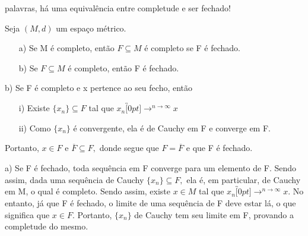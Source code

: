 \documentclass[MetricSpaces/metric_notes.tex]{subfiles}
\begin{document}
palavras, há uma equivalência entre completude e ser fechado!
\begin{prop*}
	Seja \((M, d)\) um espaço métrico.
	\begin{itemize}
		\item[a)] Se M é completo, então \(F\subseteq{M}\) é completo se F é fechado.
		\item[b)] Se \(F\subseteq{M}\) é completo, então F é fechado.
	\end{itemize}
\end{prop*}
\begin{proof*}
	b) Se F é completo e x pertence ao seu fecho, então
	\begin{itemize}
		\item[i)] Existe \(\{x_{n}\}\subseteq{F}\) tal que \(x_{n}\overbracket[0pt]{\longrightarrow}^{n\to \infty}x\)
		\item[ii)] Como \(\{x_{n}\}\) é convergente, ela é de Cauchy em F e converge em F.
	\end{itemize}
	Portanto, \(x\in F\) e \(\overline{F}\subseteq{F},\) donde segue que \(F = \overline{F}\) e que F é fechado.

	a) Se F é fechado, toda sequência em F converge para um elemento de F. Sendo assim, dada uma sequência de Cauchy \(\{x_{n}\}\subseteq{F},\) ela é,
	em particular, de Cauchy em M, o qual é completo. Sendo assim, existe \(x\in M\) tal que \(x_{n}\overbracket[0pt]{\longrightarrow}^{n\to \infty}x.\) No entanto,
	já que F é fechado, o limite de uma sequência de F deve estar lá, o que significa que \(x\in F\). Portanto, \(\{x_{n}\}\) de Cauchy tem seu limite em F, provando a
	completude do mesmo. \qedsymbol
\end{proof*}
\end{document}
